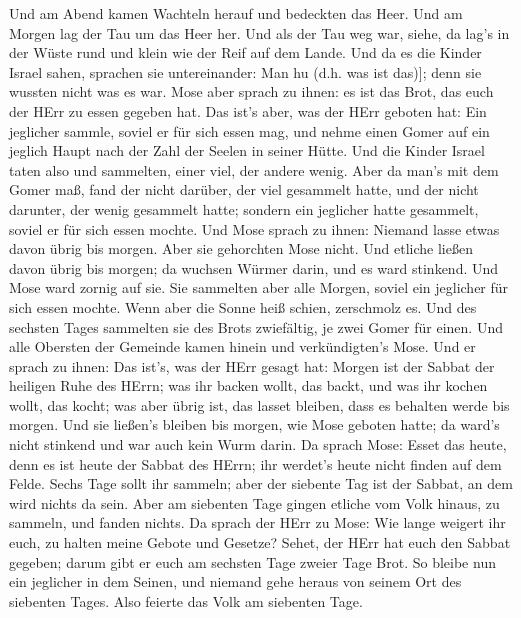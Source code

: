  Und am Abend kamen Wachteln herauf und bedeckten das Heer.
Und am Morgen lag der Tau um das Heer her.  Und als der Tau
weg war, siehe, da lag's in der Wüste rund und klein wie der Reif auf
dem Lande.  Und da es die Kinder Israel sahen, sprachen sie
untereinander: Man hu (d.h. was ist das){]}; denn sie wussten nicht was
es war. Mose aber sprach zu ihnen: es ist das Brot, das euch der HErr zu
essen gegeben hat.  Das ist's aber, was der HErr geboten
hat: Ein jeglicher sammle, soviel er für sich essen mag, und nehme einen
Gomer auf ein jeglich Haupt nach der Zahl der Seelen in seiner Hütte.
 Und die Kinder Israel taten also und sammelten, einer
viel, der andere wenig.  Aber da man's mit dem Gomer maß,
fand der nicht darüber, der viel gesammelt hatte, und der nicht
darunter, der wenig gesammelt hatte; sondern ein jeglicher hatte
gesammelt, soviel er für sich essen mochte.  Und Mose
sprach zu ihnen: Niemand lasse etwas davon übrig bis morgen.
 Aber sie gehorchten Mose nicht. Und etliche ließen davon
übrig bis morgen; da wuchsen Würmer darin, und es ward stinkend. Und
Mose ward zornig auf sie.  Sie sammelten aber alle Morgen,
soviel ein jeglicher für sich essen mochte. Wenn aber die Sonne heiß
schien, zerschmolz es.  Und des sechsten Tages sammelten
sie des Brots zwiefältig, je zwei Gomer für einen. Und alle Obersten der
Gemeinde kamen hinein und verkündigten's Mose.  Und er
sprach zu ihnen: Das ist's, was der HErr gesagt hat: Morgen ist der
Sabbat der heiligen Ruhe des HErrn; was ihr backen wollt, das backt, und
was ihr kochen wollt, das kocht; was aber übrig ist, das lasset bleiben,
dass es behalten werde bis morgen.  Und sie ließen's
bleiben bis morgen, wie Mose geboten hatte; da ward's nicht stinkend und
war auch kein Wurm darin.  Da sprach Mose: Esset das heute,
denn es ist heute der Sabbat des HErrn; ihr werdet's heute nicht finden
auf dem Felde.  Sechs Tage sollt ihr sammeln; aber der
siebente Tag ist der Sabbat, an dem wird nichts da sein. 
Aber am siebenten Tage gingen etliche vom Volk hinaus, zu sammeln, und
fanden nichts.  Da sprach der HErr zu Mose: Wie lange
weigert ihr euch, zu halten meine Gebote und Gesetze? 
Sehet, der HErr hat euch den Sabbat gegeben; darum gibt er euch am
sechsten Tage zweier Tage Brot. So bleibe nun ein jeglicher in dem
Seinen, und niemand gehe heraus von seinem Ort des siebenten Tages.
 Also feierte das Volk am siebenten Tage.

